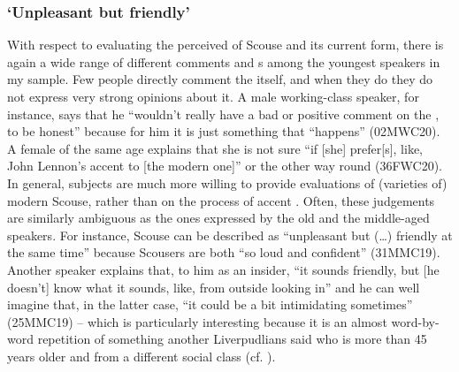 \subsubsection{`Unpleasant but friendly'}
\label{aware_res.eval.young.like}

With respect to evaluating the perceived  of Scouse and its current form, there is again a wide range of different comments and s among the youngest speakers in my sample.
Few people directly comment the  itself, and when they do they do not express very strong opinions about it.
A male working-class speaker, for instance, says that he ``wouldn't really have a bad or positive comment on the , to be honest'' because for him it is just something that ``happens'' (02MWC20).
A female of the same age explains that she is not sure ``if [she] prefer[s], like, John Lennon's accent to [the modern one]'' or the other way round (36FWC20).
In general, subjects are much more willing to provide evaluations of (varieties of) modern Scouse, rather than on the process of accent .
Often, these judgements are similarly ambiguous as the ones expressed by the old and the middle-aged speakers.
For instance, Scouse can be described as ``unpleasant but (\ldots) friendly at the same time'' because Scousers are both ``so loud and confident'' (31MMC19).
Another speaker explains that, to him as an insider, ``it sounds friendly, but [he doesn't] know what it sounds, like, from outside looking in'' and he can well imagine that, in the latter case, ``it could be a bit intimidating sometimes'' (25MMC19) -- which is particularly interesting because it is an almost word-by-word repetition of something another Liverpudlians said who is more than 45 years older and from a different social class (cf. ).

